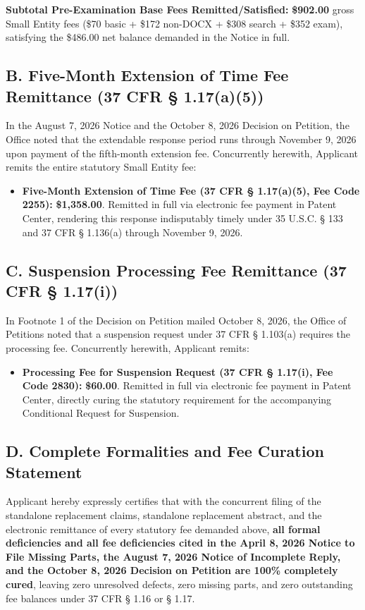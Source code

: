 \documentclass[11pt,letterpaper]{article}
\begin{document}
\noindent\textbf{Subtotal Pre-Examination Base Fees Remitted/Satisfied:} \textbf{\$902.00} gross Small Entity fees (\$70 basic + \$172 non-DOCX + \$308 search + \$352 exam), satisfying the \$486.00 net balance demanded in the Notice in full.

\subsection*{B. Five-Month Extension of Time Fee Remittance (37 CFR \S{} 1.17(a)(5))}
In the August 7, 2026 Notice and the October 8, 2026 Decision on Petition, the Office noted that the extendable response period runs through November 9, 2026 upon payment of the fifth-month extension fee. Concurrently herewith, Applicant remits the entire statutory Small Entity fee:
\begin{itemize}[leftmargin=*]
    \item \textbf{Five-Month Extension of Time Fee (37 CFR \S{} 1.17(a)(5), Fee Code 2255):} \textbf{\$1,358.00}. Remitted in full via electronic fee payment in Patent Center, rendering this response indisputably timely under 35 U.S.C. \S{} 133 and 37 CFR \S{} 1.136(a) through November 9, 2026.
\end{itemize}

\subsection*{C. Suspension Processing Fee Remittance (37 CFR \S{} 1.17(i))}
In Footnote 1 of the Decision on Petition mailed October 8, 2026, the Office of Petitions noted that a suspension request under 37 CFR \S{} 1.103(a) requires the processing fee. Concurrently herewith, Applicant remits:
\begin{itemize}[leftmargin=*]
    \item \textbf{Processing Fee for Suspension Request (37 CFR \S{} 1.17(i), Fee Code 2830):} \textbf{\$60.00}. Remitted in full via electronic fee payment in Patent Center, directly curing the statutory requirement for the accompanying Conditional Request for Suspension.
\end{itemize}

\subsection*{D. Complete Formalities and Fee Curation Statement}
Applicant hereby expressly certifies that with the concurrent filing of the standalone replacement claims, standalone replacement abstract, and the electronic remittance of every statutory fee demanded above, \textbf{all formal deficiencies and all fee deficiencies cited in the April 8, 2026 Notice to File Missing Parts, the August 7, 2026 Notice of Incomplete Reply, and the October 8, 2026 Decision on Petition are 100\% completely cured}, leaving zero unresolved defects, zero missing parts, and zero outstanding fee balances under 37 CFR \S{} 1.16 or \S{} 1.17.
\end{document}
